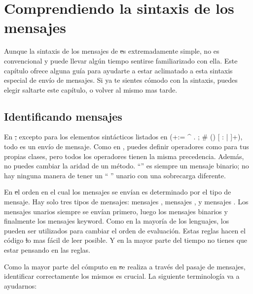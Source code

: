 \documentclass[a4paper,10pt,twoside]{book}
\begin{document}
	\renewcommand{\nnbb}[2]{} %
	\sloppy
\fi
\renewcommand\yellowbox[1]{\relax}
\renewcommand\nnbb[2]{\relax}

\chapter{Comprendiendo la sintaxis de los mensajes}

Aunque la sintaxis de los mensajes de \st es extremadamente simple, no es convencional y puede llevar alg\'un tiempo sentirse familiarizado con ella.
Este cap\'itulo ofrece alguna gu\'ia para ayudarte a estar aclimatado a esta sintaxis especial de env\'io de mensajes.
Si ya te sientes c\'omodo con la sintaxis, puedes elegir saltarte este cap\'itulo, o volver al mismo mas tarde.

\section{Identificando mensajes}

En \st, excepto para los elementos sint\'acticos listados en  (\ct+:= ^ . ; # () {} [ : | ]+), todo es un env\'io de mensaje.
Como en , puedes definir operadores como \ct{+} para tus propias clases, pero todos los operadores tienen la misma precedencia.
Adem\'as, no puedes cambiar la aridad  de un m\'etodo. ``\ct{-}'' es siempre un mensaje binario; no hay ninguna manera de tener un `` \ct{-}'' unario con una sobrecarga diferente.

En \st el orden en el cual los mensajes se env\'ian es determinado por el tipo de mensaje. Hay solo tres tipos de mensajes: mensajes , mensajes , y mensajes . Los mensajes unarios siempre se env\'ian primero, luego los mensajes binarios y finalmente los mensajes keyword. Como en la mayor\'ia de los lenguajes, los  pueden ser utilizados para cambiar el orden de evaluaci\'on. Estas reglas hacen el c\'odigo \st lo mas f\'acil de leer posible. Y en la mayor parte del tiempo no tienes que estar pensando en las reglas.

Como la mayor parte del c\'omputo en \st se realiza a trav\'es del pasaje de mensajes, identificar correctamente los mismos es crucial. La siguiente terminolog\'ia va a ayudarnos:
\end{document}
